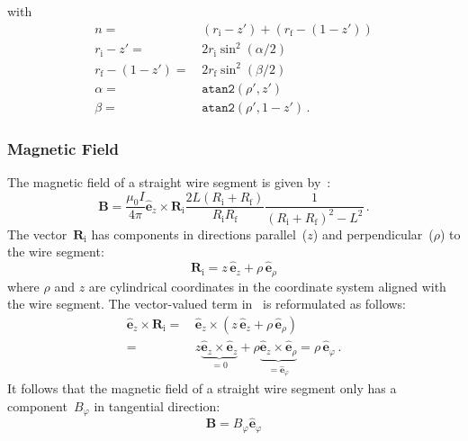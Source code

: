 with
\begin{align}
  n                       =&\, (r_\mathrm{i} - z') + (r_\mathrm{f} - (1 - z')) \\
  r_\mathrm{i} - z'       =&\, 2 r_\mathrm{i} \sin^2(\alpha/2) \label{eqn:ri_zp} \\
  r_\mathrm{f} - (1 - z') =&\, 2 r_\mathrm{f} \sin^2(\beta/2)  \label{eqn:rf_zp_1} \\
  \alpha =&\, \texttt{atan2}(\rho', z')   \label{eqn:sws_alpha} \\
  \beta  =&\, \texttt{atan2}(\rho', 1-z') \label{eqn:sws_beta} \, .
\end{align}

\subsubsection{Magnetic Field}
The magnetic field of a straight wire segment
is given by~\cite{hanson_hirshman_2002}:
\begin{equation}
 \mathbf{B}
 = \frac{\mu_0 I}{4 \pi}
   \hat{\mathbf{e}}_z \times \mathbf{R}_\mathrm{i}
   \frac{2 L (R_\mathrm{i} + R_\mathrm{f})}{R_\mathrm{i} R_\mathrm{f}} \frac{1}{\left(R_\mathrm{i} + R_\mathrm{f}\right)^2 - L^2} \, . \label{eqn:sws_B_phi}
\end{equation}
The vector~$\mathbf{R}_\mathrm{i}$ has components in directions parallel~($z$) and perpendicular~($\rho$) to the wire segment:
\begin{equation}
 \mathbf{R}_\mathrm{i}
 = z \,\hat{\mathbf{e}}_z + \rho \,\hat{\mathbf{e}}_\rho
\end{equation}
where $\rho$ and $z$ are cylindrical coordinates in the coordinate system aligned with the wire segment.
The vector-valued term in~ is reformulated as follows:
\begin{align}
 \hat{\mathbf{e}}_z \times \mathbf{R}_\mathrm{i}
 =&\, \hat{\mathbf{e}}_z \times \left( z \,\hat{\mathbf{e}}_z + \rho \,\hat{\mathbf{e}}_\rho \right) \nonumber \\
 =&\,      z \underbrace{\hat{\mathbf{e}}_z \times \hat{\mathbf{e}}_z}_{=0}
      + \rho \underbrace{\hat{\mathbf{e}}_z \times \hat{\mathbf{e}}_\rho}_{=\hat{\mathbf{e}}_\varphi}
 = \rho \,\hat{\mathbf{e}}_\varphi \, .
\end{align}
It follows that the magnetic field of a straight wire segment only has a component~$B_\varphi$ in tangential direction:
\begin{equation}
 \mathbf{B} = B_\varphi \hat{\mathbf{e}}_\varphi
\end{equation}
